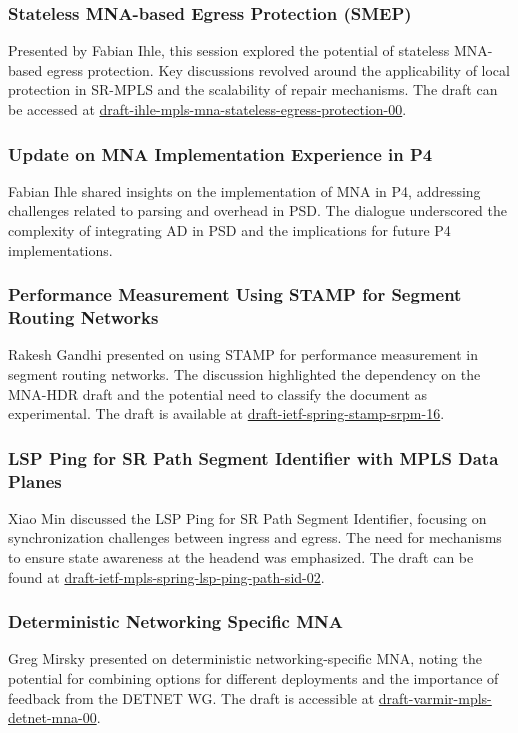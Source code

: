\documentclass{article}
\begin{document}
\subsubsection{Stateless MNA-based Egress Protection (SMEP)}
Presented by Fabian Ihle, this session explored the potential of stateless MNA-based egress protection. Key discussions revolved around the applicability of local protection in SR-MPLS and the scalability of repair mechanisms. The draft can be accessed at \href{https://datatracker.ietf.org/doc/draft-ihle-mpls-mna-stateless-egress-protection-00}{draft-ihle-mpls-mna-stateless-egress-protection-00}.

\subsubsection{Update on MNA Implementation Experience in P4}
Fabian Ihle shared insights on the implementation of MNA in P4, addressing challenges related to parsing and overhead in PSD. The dialogue underscored the complexity of integrating AD in PSD and the implications for future P4 implementations.

\subsubsection{Performance Measurement Using STAMP for Segment Routing Networks}
Rakesh Gandhi presented on using STAMP for performance measurement in segment routing networks. The discussion highlighted the dependency on the MNA-HDR draft and the potential need to classify the document as experimental. The draft is available at \href{https://datatracker.ietf.org/doc/draft-ietf-spring-stamp-srpm-16}{draft-ietf-spring-stamp-srpm-16}.

\subsubsection{LSP Ping for SR Path Segment Identifier with MPLS Data Planes}
Xiao Min discussed the LSP Ping for SR Path Segment Identifier, focusing on synchronization challenges between ingress and egress. The need for mechanisms to ensure state awareness at the headend was emphasized. The draft can be found at \href{https://datatracker.ietf.org/doc/draft-ietf-mpls-spring-lsp-ping-path-sid-02}{draft-ietf-mpls-spring-lsp-ping-path-sid-02}.

\subsubsection{Deterministic Networking Specific MNA}
Greg Mirsky presented on deterministic networking-specific MNA, noting the potential for combining options for different deployments and the importance of feedback from the DETNET WG. The draft is accessible at \href{https://datatracker.ietf.org/doc/draft-varmir-mpls-detnet-mna-00}{draft-varmir-mpls-detnet-mna-00}.
\end{document}
